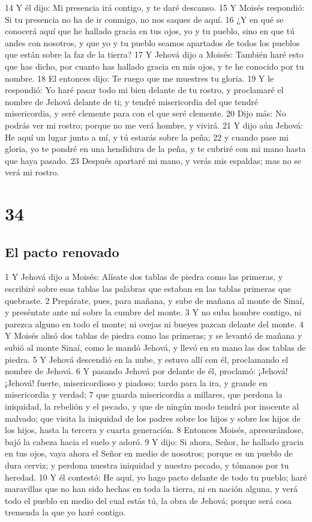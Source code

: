 14 Y él dijo: Mi presencia irá contigo, y te daré descanso.
15 Y Moisés respondió: Si tu presencia no ha de ir conmigo, no nos saques de aquí.
16 ¿Y en qué se conocerá aquí que he hallado gracia en tus ojos, yo y tu pueblo, sino en que tú andes con nosotros, y que yo y tu pueblo seamos apartados de todos los pueblos que están sobre la faz de la tierra?
17 Y Jehová dijo a Moisés: También haré esto que has dicho, por cuanto has hallado gracia en mis ojos, y te he conocido por tu nombre.
18 El entonces dijo: Te ruego que me muestres tu gloria.
19 Y le respondió: Yo haré pasar todo mi bien delante de tu rostro, y proclamaré el nombre de Jehová delante de ti; y tendré misericordia del que tendré misericordia, y seré clemente para con el que seré clemente.
20 Dijo más: No podrás ver mi rostro; porque no me verá hombre, y vivirá.
21 Y dijo aún Jehová: He aquí un lugar junto a mí, y tú estarás sobre la peña;
22 y cuando pase mi gloria, yo te pondré en una hendidura de la peña, y te cubriré con mi mano hasta que haya pasado.
23 Después apartaré mi mano, y verás mis espaldas; mas no se verá mi rostro.

\chapter{34}

\section*{El pacto renovado}

1 Y Jehová dijo a Moisés: Alísate dos tablas de piedra como las primeras, y escribiré sobre esas tablas las palabras que estaban en las tablas primeras que quebraste.
2 Prepárate, pues, para mañana, y sube de mañana al monte de Sinaí, y preséntate ante mí sobre la cumbre del monte.
3 Y no suba hombre contigo, ni parezca alguno en todo el monte; ni ovejas ni bueyes pazcan delante del monte.
4 Y Moisés alisó dos tablas de piedra como las primeras; y se levantó de mañana y subió al monte Sinaí, como le mandó Jehová, y llevó en su mano las dos tablas de piedra.
5 Y Jehová descendió en la nube, y estuvo allí con él, proclamando el nombre de Jehová.
6 Y pasando Jehová por delante de él, proclamó: ¡Jehová! ¡Jehová! fuerte, misericordioso y piadoso; tardo para la ira, y grande en misericordia y verdad;
7 que guarda misericordia a millares, que perdona la iniquidad, la rebelión y el pecado, y que de ningún modo tendrá por inocente al malvado; que visita la iniquidad de los padres sobre los hijos y sobre los hijos de los hijos, hasta la tercera y cuarta generación.
8 Entonces Moisés, apresurándose, bajó la cabeza hacia el suelo y adoró.
9 Y dijo: Si ahora, Señor, he hallado gracia en tus ojos, vaya ahora el Señor en medio de nosotros; porque es un pueblo de dura cerviz; y perdona nuestra iniquidad y nuestro pecado, y tómanos por tu heredad.
10 Y él contestó: He aquí, yo hago pacto delante de todo tu pueblo; haré maravillas que no han sido hechas en toda la tierra, ni en nación alguna, y verá todo el pueblo en medio del cual estás tú, la obra de Jehová; porque será cosa tremenda la que yo haré contigo.

